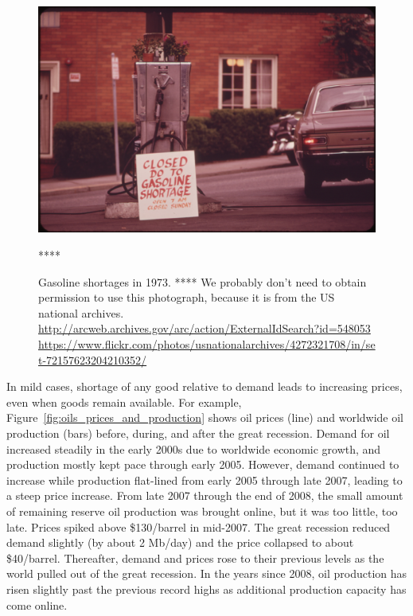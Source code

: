 \begin{figure}[!ht]
\centering\
\includegraphics[width=\linewidth]{Part_0/Chapter_Introduction/images/gas_shortage_1973.jpg}
\caption[Gasoline shortage]{Gasoline shortages in 1973.
**** We probably don't need to obtain permission to use this photograph, because
it is from the US national archives.
\url{http://arcweb.archives.gov/arc/action/ExternalIdSearch?id=548053}
\url{https://www.flickr.com/photos/usnationalarchives/4272321708/in/set-72157623204210352/}}
****
\label{fig:gas_shortage}
\end{figure}

In mild cases,
shortage of any good relative to demand leads to increasing prices,
even when goods remain available.
For example,
Figure~\ref{fig:oils_prices_and_production} shows oil prices (line) and 
worldwide oil production (bars) before, during, and after the great recession. 
Demand for oil increased steadily in the early 2000s
due to worldwide economic growth, 
and production mostly kept pace through early 2005.
However, demand continued to increase while 
production flat-lined from early 2005 through late 2007, 
leading to a steep price increase.
From late 2007 through the end of 2008, 
the small amount of remaining reserve oil production was brought online,
but it was too little, too late.
Prices spiked above \$130/barrel in mid-2007. 
The great recession reduced demand slightly (by about 2 Mb/day)
and the price collapsed to about \$40/barrel.
Thereafter, demand and prices rose to their previous levels 
as the world pulled out of the great recession.
In the years since 2008, oil production has risen slightly past the previous record highs
as additional production capacity has come online.

